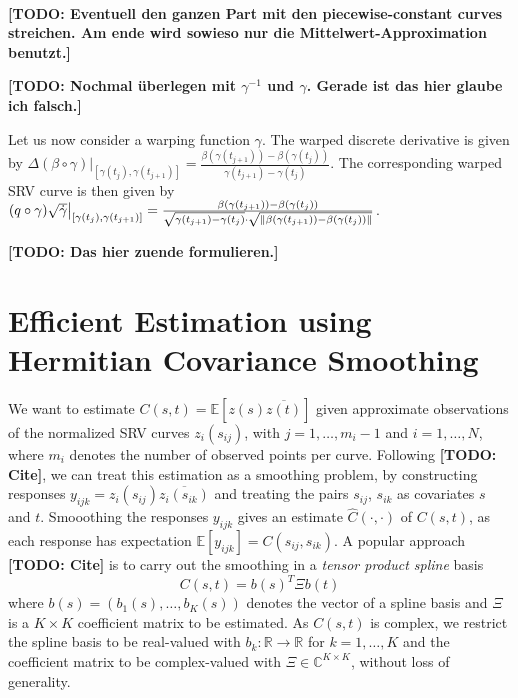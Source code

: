 \paragraph{} 
\textbf{[TODO: Eventuell den ganzen Part mit den piecewise-constant curves streichen. Am ende wird sowieso nur die Mittelwert-Approximation benutzt.]}

\textbf{[TODO: Nochmal überlegen mit $\gamma^{-1}$ und $\gamma$. Gerade ist das hier glaube ich falsch.]}

Let us now consider a warping function $\gamma$.
The warped discrete derivative is given by $\Delta (\beta \circ \gamma) \big\rvert_{[\gamma(t_j), \gamma(t_{j+1})]} = \frac{\beta(\gamma(t_{j+1})) - \beta(\gamma(t_{j}))}{\gamma(t_{j+1}) - \gamma(t_j)}$.
The corresponding warped SRV curve is then given by  $(q \circ \gamma) \sqrt{\dot\gamma} \big\rvert_{[\gamma(t_j), \gamma(t_{j+1})]} = \frac{\beta(\gamma(t_{j+1})) - \beta(\gamma(t_j))}{\sqrt{\gamma(t_{j+1}) - \gamma(t_j)} \cdot \sqrt{\lVert\beta(\gamma(t_{j+1})) - \beta(\gamma(t_j))\rVert}}$.

\textbf{[TODO: Das hier zuende formulieren.]}



\section{Efficient Estimation using Hermitian Covariance Smoothing}
\label{sec:cov}

We want to estimate $C(s,t) = \mathbb{E}[z(s)\overline{z(t)}]$ given approximate observations of the normalized SRV curves $z_i(s_{ij})$, with $j = 1,\dots,m_i-1$ and $i=1,\dots,N$, where $m_i$ denotes the number of observed points per curve.
Following \textbf{[TODO: Cite]}, we can treat this estimation as a smoothing problem, by constructing responses $y_{ijk} = z_i(s_{ij}) \overline{z_i(s_{ik})}$ and treating the pairs $s_{ij}$, $s_{ik}$ as covariates $s$ and $t$.
Smooothing the responses $y_{ijk}$ gives an estimate $\hat C(\cdot, \cdot)$ of $C(s,t)$, as each response has expectation $\mathbb{E}[y_{ijk}] = C(s_{ij},s_{ik})$. 
A popular approach \textbf{[TODO: Cite]} is to carry out the smoothing in a \emph{tensor product spline} basis 
$$ C(s,t) = b(s)^T \Xi b(t) $$
where $b(s) = (b_1(s),\dots,b_K(s))$ denotes the vector of a spline basis and $\Xi$ is a $K \times K$ coefficient matrix to be estimated.
As $C(s,t)$ is complex, we restrict the spline basis to be real-valued with $b_k : \mathbb{R} \rightarrow \mathbb{R}$ for $k = 1,\dots,K$ and the coefficient matrix to be complex-valued with $\Xi \in \mathbb{C}^{K \times K}$, without loss of generality.


